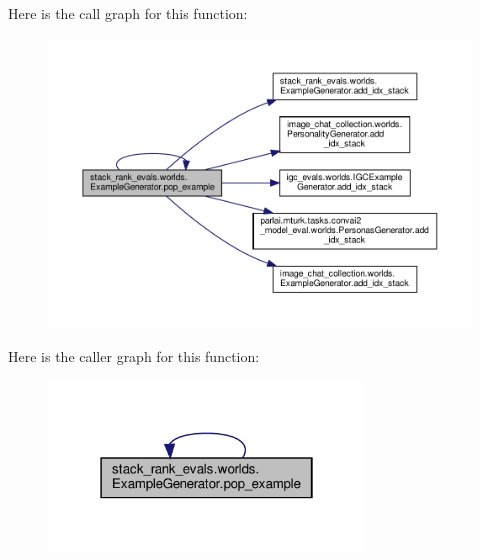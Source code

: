 Here is the call graph for this function\+:
\nopagebreak
\begin{figure}[H]
\begin{center}
\leavevmode
\includegraphics[width=350pt]{classstack__rank__evals_1_1worlds_1_1ExampleGenerator_ae50d35087dd679c73aa8f5354845199f_cgraph}
\end{center}
\end{figure}
Here is the caller graph for this function\+:
\nopagebreak
\begin{figure}[H]
\begin{center}
\leavevmode
\includegraphics[width=238pt]{classstack__rank__evals_1_1worlds_1_1ExampleGenerator_ae50d35087dd679c73aa8f5354845199f_icgraph}
\end{center}
\end{figure}
\mbox{\label{classstack__rank__evals_1_1worlds_1_1ExampleGenerator_ae50d35087dd679c73aa8f5354845199f}} 
